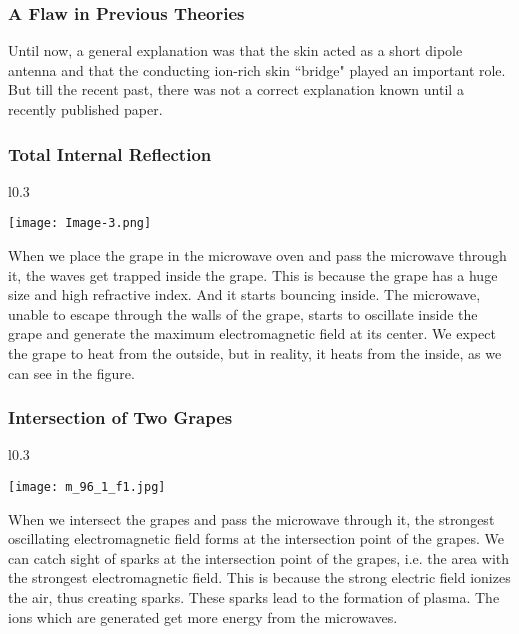 \documentclass{article}
\begin{document}
\subsubsection{\large A Flaw in Previous Theories}
Until now, a general explanation was that the skin acted as a short dipole antenna and that the conducting ion-rich skin “bridge" played an important role. But till the recent past, there was not a correct explanation known until a recently published paper.\cite{3}

\subsubsection{\Large Total Internal Reflection}

\begin{wrapfigure}{l}{0.3\textwidth}
    
    \texttt{[image: Image-3.png]}
   
\end{wrapfigure}
\Large
When we place the grape in the microwave oven and pass the microwave through it, the waves get trapped inside the grape. This is because the grape has a huge size and high refractive index.
And it starts bouncing inside. The microwave, unable to escape through the walls of the grape, starts to oscillate inside the grape and generate the maximum electromagnetic field at its center.
We expect the grape to heat from the outside, but in reality, it heats from the inside, as we can see in the figure.
\subsubsection{\Large Intersection of Two Grapes}

\begin{wrapfigure}{l}{0.3\textwidth}
    
    \texttt{[image: m\_96\_1\_f1.jpg]}
   
\end{wrapfigure}
\Large

When we intersect the grapes and pass the microwave through it, the strongest oscillating electromagnetic field forms at the intersection point of the grapes.
We can catch sight of sparks at the intersection point of the grapes, i.e. the area with the strongest electromagnetic field. This is because the strong electric field ionizes the air, thus creating sparks. These sparks lead to the formation of plasma. The ions which are generated get more energy from the microwaves.
\end{document}
